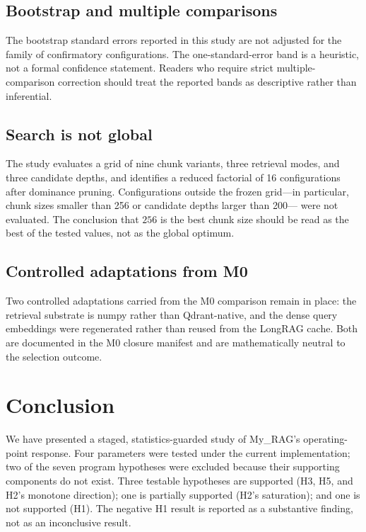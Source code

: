 \documentclass[11pt,a4paper]{article}
\begin{document}
\subsection{Bootstrap and multiple comparisons}
The bootstrap standard errors reported in this study are not
adjusted for the family of confirmatory configurations. The
one-standard-error band is a heuristic, not a formal confidence
statement. Readers who require strict multiple-comparison
correction should treat the reported bands as descriptive rather
than inferential.

\subsection{Search is not global}
The study evaluates a grid of nine chunk variants, three retrieval
modes, and three candidate depths, and identifies a reduced
factorial of \num{16} configurations after dominance pruning.
Configurations outside the frozen grid---in particular, chunk sizes
smaller than \num{256} or candidate depths larger than \num{200}---
were not evaluated. The conclusion that $256$ is the best chunk
size should be read as the best of the tested values, not as the
global optimum.

\subsection{Controlled adaptations from M0}
Two controlled adaptations carried from the M0 comparison remain in
place: the retrieval substrate is numpy rather than Qdrant-native,
and the dense query embeddings were regenerated rather than reused
from the LongRAG cache. Both are documented in the M0 closure
manifest and are mathematically neutral to the selection outcome.

\section{Conclusion}

We have presented a staged, statistics-guarded study of My\_RAG's
operating-point response. Four parameters were tested under the
current implementation; two of the seven program hypotheses were
excluded because their supporting components do not exist. Three
testable hypotheses are supported (H3, H5, and H2's monotone
direction); one is partially supported (H2's saturation); and one
is not supported (H1). The negative H1 result is reported as a
substantive finding, not as an inconclusive result.
\end{document}
